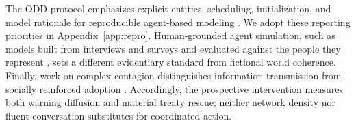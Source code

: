 The ODD protocol emphasizes explicit entities, scheduling, initialization, and
model rationale for reproducible agent-based modeling \cite{odd}. We adopt
these reporting priorities in Appendix~\ref{app:repro}. Human-grounded agent
simulation, such as models built from interviews and surveys and evaluated
against the people they represent \cite{park1000}, sets a different evidentiary standard from fictional
world coherence. Finally, work on complex contagion distinguishes information
transmission from socially reinforced adoption \cite{centola}. Accordingly,
the prospective intervention measures both warning diffusion and material
treaty rescue; neither network density nor fluent conversation substitutes
for coordinated action.
